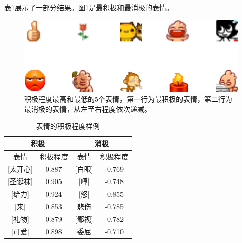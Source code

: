 \documentclass[12pt, oneside]{article}
\begin{document}
\begin{spacing}{1.5}
\begin{CJK}{UTF8}{gbsn}
表\ref{tbl:weighted_expreesions}展示了一部分结果。图\ref{fig:weighted_expressions_top5}是最积极和最消极的表情。

\begin{figure}
	\centering
	\includegraphics[width=0.35\linewidth]{../result/charts/weighted_expressions_top5}
	\caption{积极程度最高和最低的5个表情，第一行为最积极的表情，第二行为最消极的表情，从左至右程度依次递减。}
	\label{fig:weighted_expressions_top5}
\end{figure}

\begin{table}[]
\centering
\begin{tabular}{|c|c|c|c|}
\hline
\multicolumn{2}{|c|}{积极} & \multicolumn{2}{c|}{消极} \\ \hline
表情            & 积极程度     & 表情          & 积极程度      \\ \hline
{[}太开心{]}     & 0.887    & {[}白眼{]}    & -0.769    \\ \hline
{[}圣诞袜{]}     & 0.905    & {[}哼{]}     & -0.748    \\ \hline
{[}给力{]}      & 0.924    & {[}怒{]}     & -0.855    \\ \hline
{[}来{]}       & 0.853    & {[}悲伤{]}    & -0.785    \\ \hline
{[}礼物{]}      & 0.879    & {[}鄙视{]}    & -0.782    \\ \hline
{[}可爱{]}      & 0.898    & {[}委屈{]}    & -0.710    \\ \hline
\end{tabular}
\caption{表情的积极程度样例}
\label{tbl:weighted_expreesions}
\end{table}

\newpage
\renewcommand\refname{参考文献}



\end{CJK}
\end{spacing}
\end{document}
